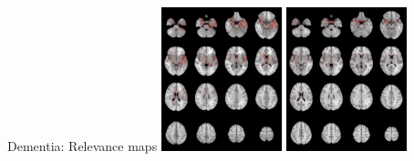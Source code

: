 \documentclass[c]{beamer}
\begin{document}
	\begin{frame}{Dementia: Relevance maps} %
		\vfill
		\centering
		\newcommand{\width}{3.5cm}
		\includegraphics[width=\width]{data/1398_1.png}
		\includegraphics[width=\width]{data/1504_1.png}

\end{frame}
\end{document}
